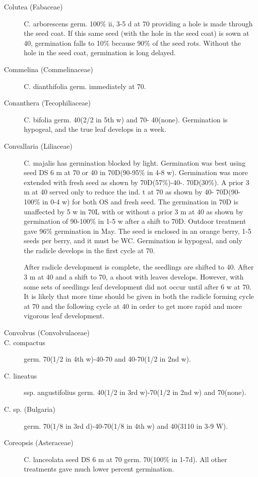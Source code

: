 \begin{description}
\item [Colutea (Fabaceae)] C. arborescens germ. 100\% ii, 3-5 d at 70 providing a
hole is made through the seed coat. If this same seed (with the hole in the seed coat)
is sown at 40, germination falls to 10\% because 90\% of the seed rots. Without the
hole in the seed coat, germination is long delayed.
\item [Commelina (Commelinaceae)] C. dianthifolia germ. immediately at 70.
\item [Conanthera (Tecophiliaceae)] C. bifolia germ. 40(2/2 in 5th w) and 70-
40(none). Germination is hypogeal, and the true leaf develops in a week.
\item [Convallaria (Liliaceae)] C. majalis has germination blocked by light.
Germination was best using seed DS 6 m at 70 or 40 in 70D(90-95\% in 4-8 w).
Germination was more extended with fresh seed as shown by 70D(57\%)-40-.
70D(30\%). A prior 3 m at 40 served only to reduce the ind. t at 70 as shown by 40-
70D(90-100\% in 0-4 w) for both OS and fresh seed. The germination in 70D is
unaffected by 5 w in 70L with or without a prior 3 m at 40 as shown by germination of
90-100\% in 1-5 w after a shift to 70D. Outdoor treatment gave 96\% germination in
May. The seed is enclosed in an orange berry, 1-5 seeds per berry, and it must be
WC. Germination is hypogeal, and only the radicle develops in the first cycle at 70.

After radicle development is complete, the seedlings are shifted to 40. After 3 m at 40
and a shift to 70, a shoot with leaves develops. However, with some sets of seedlings
leaf development did not occur until after 6 w at 70. It is likely that more time should be
given in both the radicle forming cycle at 70 and the following cycle at 40 in order to
get more rapid and more vigorous leaf development.

\item [Convolvus (Convolvulaceae)]
\item [C. compactus] germ. 70(1/2 in 4th w)-40-70 and 40-70(1/2 in 2nd w).
\item [C. lineatus] ssp. angustifolius germ. 40(1/2 in 3rd w)-70(1/2 in 2nd w) and
70(none).
\item [C. sp. (Bulgaria)] germ. 70(1/8 in 3rd d)-40-70(1/8 in 4th w) and 40(3110 in 3-9
W).
\item [Coreopsis (Asteraceae)] C. lanceolata seed DS 6 m at 70 germ. 70(100\%
in 1-7d). All other treatments gave much lower percent germination.


\end{description}

